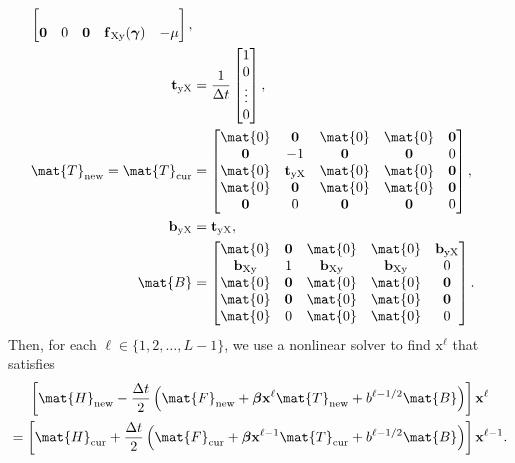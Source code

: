 \documentclass{jpmarticle}
\renewcommand{\vec}[1]{\boldsymbol{\mathrm{#1}}}
\let\subequationsorig\subequations%
\let\endsubequationsorig\endsubequations%
\renewenvironment{subequations}{
  \subequationsorig
  \renewcommand{\theequation}{\theparentequation.\arabic{equation}}
}{
  \endsubequationsorig
}
\begin{document}
\begin{subequations}
\begin{align}
\begin{bmatrix}
      \\
      \vec{0} & 0 & \vec{0} & \vec{f}_{\mathrm{Xy}}(\vec{\gamma}) & - \mu
    \end{bmatrix},
    \\
    \vec{t}_{\mathrm{yX}} &=
    \frac{1}{\Delta t}
    \begin{bmatrix}
      1 \\ 0 \\ \vdots \\ 0
    \end{bmatrix},
    \\
    \mat{T}_{\mathrm{new}} =
    \mat{T}_{\mathrm{cur}} &=
    \begin{bmatrix}
      \mat{0} & \vec{0} & \mat{0} & \mat{0} & \vec{0}
      \\
      \vec{0} & - 1 & \vec{0} & \vec{0} & 0
      \\
      \mat{0} & \vec{t}_{\mathrm{yX}} & \mat{0} & \mat{0} & \vec{0}
      \\
      \mat{0} & \vec{0} & \mat{0} & \mat{0} & \vec{0}
      \\
      \vec{0} & 0 & \vec{0} & \vec{0} & 0
    \end{bmatrix},
    \\
    \vec{b}_{\mathrm{yX}} &= \vec{t}_{\mathrm{yX}},
    \\
    \mat{B} &=
    \begin{bmatrix}
      \mat{0} & \vec{0} & \mat{0} & \mat{0} & \vec{b}_{\mathrm{yX}}
      \\
      \vec{b}_{\mathrm{Xy}} & 1 & \vec{b}_{\mathrm{Xy}} & \vec{b}_{\mathrm{Xy}} & 0
      \\
      \mat{0} & \vec{0} & \mat{0} & \mat{0} & \vec{0}
      \\
      \mat{0} & \vec{0} & \mat{0} & \mat{0} & \vec{0}
      \\
      \mat{0} & 0 & \mat{0} & \mat{0} & 0
    \end{bmatrix}.
  \end{align}
  Then, for each $\ell \in \{1, 2, \ldots, L - 1\}$,
  we use a nonlinear solver to find $\vec{x}^{\ell}$ that satisfies
  \begin{multline}
    \label{step_time_since_entry_structured}
    \left[
      \mat{H}_{\mathrm{new}}
      - \frac{\Delta t}{2}
      \left(
        \mat{F}_{\mathrm{new}}
        + \vec{\beta} \vec{x}^{\ell} \mat{T}_{\mathrm{new}}
        + b^{\ell - 1 / 2} \mat{B}
      \right)
    \right] \vec{x}^{\ell}
    \\
    = \left[
      \mat{H}_{\mathrm{cur}}
      + \frac{\Delta t}{2}
      \left(
        \mat{F}_{\mathrm{cur}}
        + \vec{\beta} \vec{x}^{\ell - 1} \mat{T}_{\mathrm{cur}}
        + b^{\ell - 1 / 2} \mat{B}
      \right)
    \right] \vec{x}^{\ell - 1}.
  \end{multline}
\end{subequations}
\end{document}
